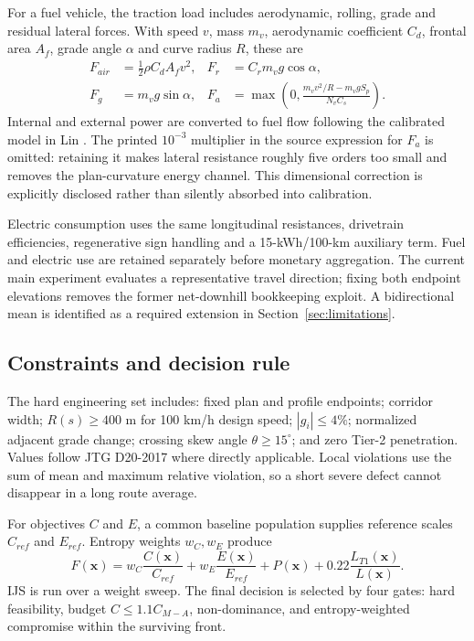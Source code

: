\documentclass[preprint,12pt]{elsarticle}
\begin{document}
For a fuel vehicle, the traction load includes aerodynamic, rolling, grade and residual lateral forces. With speed $v$, mass $m_v$, aerodynamic coefficient $C_d$, frontal area $A_f$, grade angle $\alpha$ and curve radius $R$, these are
\begin{align}
F_{air}&=\tfrac12\rho C_d A_fv^2, & F_r&=C_rm_vg\cos\alpha,\\
F_g&=m_vg\sin\alpha, &
F_a&=\max\left(0,\frac{m_vv^2/R-m_vgS_p}{N_vC_s}\right).
\end{align}
Internal and external power are converted to fuel flow following the calibrated model in Lin \cite{lin2025}. The printed $10^{-3}$ multiplier in the source expression for $F_a$ is omitted: retaining it makes lateral resistance roughly five orders too small and removes the plan-curvature energy channel. This dimensional correction is explicitly disclosed rather than silently absorbed into calibration.

Electric consumption uses the same longitudinal resistances, drivetrain efficiencies, regenerative sign handling and a 15-kWh/100-km auxiliary term. Fuel and electric use are retained separately before monetary aggregation. The current main experiment evaluates a representative travel direction; fixing both endpoint elevations removes the former net-downhill bookkeeping exploit. A bidirectional mean is identified as a required extension in Section~\ref{sec:limitations}.

\subsection{Constraints and decision rule}

The hard engineering set includes: fixed plan and profile endpoints; corridor width; $R(s)\geq400$ m for 100 km/h design speed; $|g_i|\leq4\%$; normalized adjacent grade change; crossing skew angle $\theta\geq15^\circ$; and zero Tier-2 penetration. Values follow JTG D20-2017 \cite{jtgd20} where directly applicable. Local violations use the sum of mean and maximum relative violation, so a short severe defect cannot disappear in a long route average.

For objectives $C$ and $E$, a common baseline population supplies reference scales $C_{ref}$ and $E_{ref}$. Entropy weights $w_C,w_E$ produce
\begin{equation}
F(\bm x)=w_C\frac{C(\bm x)}{C_{ref}}+w_E\frac{E(\bm x)}{E_{ref}}
+P(\bm x)+0.22\frac{L_{T1}(\bm x)}{L(\bm x)}.
\label{eq:scalar}
\end{equation}
IJS is run over a weight sweep. The final decision is selected by four gates: hard feasibility, budget $C\leq1.1C_{M-A}$, non-dominance, and entropy-weighted compromise within the surviving front.
\end{document}
